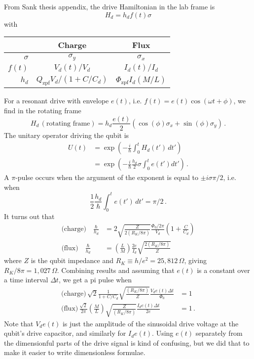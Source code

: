 From Sank thesis appendix, the drive Hamiltonian in the lab frame is
\begin{equation*}
  H_d = h_d f(t) \sigma
\end{equation*}
with
\begin{center}
  \begin{tabular}{r | c | c}
    & \textbf{Charge} & \textbf{Flux} \\
    \hline
    $\sigma$ & $\sigma_y$ & $\sigma_x$ \\
    \hline
    $f(t)$ & $V_d(t)/V_d$ & $I_d(t) / I_d$ \\
    \hline
    $h_d$ & $Q_\text{zpf} V_d/(1+C/C_d)$ & $\Phi_\text{zpf} I_d (M/L)$
  \end{tabular}
\end{center}
For a resonant drive with envelope $e(t)$, i.e. $f(t) = e(t) \cos(\omega t + \phi)$, we find in the rotating frame
\begin{equation*}
  H_d \, (\text{rotating frame}) = h_d \frac{e(t)}{2} \left( \cos(\phi) \sigma_x + \sin(\phi) \sigma_y \right) \, .
\end{equation*}
The unitary operator driving the qubit is
\begin{align*}
  U(t)
  &= \exp \left( -\frac{i}{\hbar} \int_0^t H_d(t') \, dt' \right) \\
  &= \exp \left( -\frac{i}{\hbar} \frac{h_d}{2} \sigma \int_0^t e(t') dt' \right) \, .
\end{align*}
A $\pi$-pulse occurs when the argument of the exponent is equal to $\pm i \sigma \pi / 2$, i.e. when
\begin{equation*}
  \frac{1}{2} \frac{h_d}{\hbar} \int_0^t e(t') \, dt' = \pi / 2 \, .
\end{equation*}
It turns out that
\begin{align*}
  \text{(charge)} \quad \frac{\hbar}{h_d} &=
  2 \sqrt{\frac{Z}{2 (R_K / 8\pi)}} \frac{\Phi_0/2\pi}{V_d} \left( 1 + \frac{C}{C_d} \right) \\
  \text{(flux)} \quad \frac{\hbar}{h_d} &=
  \left( \frac{L}{M} \right) \frac{2e}{I_d} \sqrt{\frac{2(R_K/8\pi)}{Z}}
\end{align*}
where $Z$ is the qubit impedance and $R_K \equiv h/e^2 = 25,812 \, \Omega$, giving $R_K/8\pi = 1,027 \, \Omega$.
Combining results and assuming that $e(t)$ is a constant over a time interval $\Delta t$,  we get a pi pulse when
\begin{align*}
  \text{(charge)} \, \sqrt{2} \frac{1}{1 + C/C_d} \sqrt{\frac{(R_K/8\pi)}{Z}} \frac{V_d e(t) \Delta t}{\Phi_0} &= 1 \\
  \text{(flux)} \, \frac{\sqrt{2}}{2 \pi} \left( \frac{M}{L} \right) \sqrt{\frac{Z}{(R_K/8\pi)}} \frac{I_d e(t) \Delta t}{2e} &= 1 \, .
\end{align*}
Note that $V_d e(t)$ is just the amplitude of the sinusoidal drive voltage at the qubit's drive capacitor, and similarly for $I_d e(t)$.
Using $e(t)$ separately from the dimensionful parts of the drive signal is kind of confusing, but we did that to make it easier to write dimensionless formulae.

